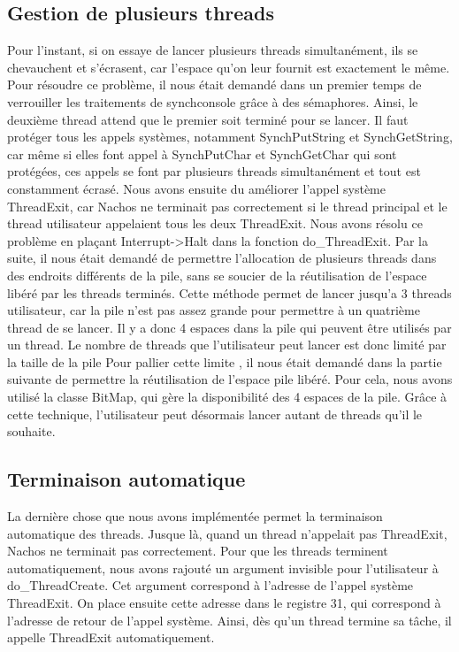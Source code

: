 \documentclass[10pt]{article}
\begin{document}
\subsection{Gestion de plusieurs threads}
Pour l'instant, si on essaye de lancer plusieurs threads simultanément, ils se chevauchent et s'écrasent, car l'espace qu'on leur fournit est exactement le même.
Pour résoudre ce problème, il nous était demandé dans un premier temps de verrouiller les traitements de synchconsole grâce à des sémaphores. Ainsi, le deuxième thread attend que le premier soit terminé pour se lancer. Il faut protéger tous les appels systèmes, notamment \textcolor{blue2}{SynchPutString} et \textcolor{blue2}{SynchGetString}, car même si elles font appel à \textcolor{blue2}{SynchPutChar} et \textcolor{blue2}{SynchGetChar} qui sont protégées, ces appels se font par plusieurs threads simultanément et tout est constamment écrasé.
\newline
Nous avons ensuite du améliorer l'appel système \textcolor{blue2}{ThreadExit}, car Nachos ne terminait pas correctement si le thread principal et le thread utilisateur appelaient tous les deux \textcolor{blue2}{ThreadExit}. Nous avons
résolu ce problème en plaçant \textcolor{red2}{Interrupt->Halt} dans la fonction \textcolor{red2}{do\_ThreadExit}.
\newline
Par la suite, il nous était demandé de permettre l'allocation de plusieurs threads dans des endroits différents de la pile, sans se soucier de la réutilisation de l'espace libéré par les threads terminés.
Cette méthode permet de lancer jusqu'a 3 threads utilisateur, car la pile n'est pas assez grande pour permettre à un quatrième thread de se lancer. Il y a donc 4 espaces dans la pile qui peuvent être utilisés par un thread.
Le nombre de threads que l'utilisateur peut lancer est donc limité
par la taille de la pile
\newline
Pour pallier cette limite , il nous était demandé dans la partie suivante de permettre la réutilisation de l'espace pile libéré.
Pour cela, nous avons utilisé la classe BitMap, qui gère la disponibilité des 4 espaces de la pile.
Grâce à cette technique, l'utilisateur peut désormais lancer autant
de threads qu'il le souhaite.

\subsection{Terminaison automatique}
La dernière chose que nous avons implémentée permet la terminaison automatique des threads. Jusque là, quand un thread n'appelait pas \textcolor{blue2}{ThreadExit}, Nachos ne terminait pas correctement.
Pour que les threads terminent automatiquement, nous avons rajouté un argument invisible pour l'utilisateur à \textcolor{red2}{do\_ThreadCreate}. Cet argument correspond à l'adresse de l'appel système \textcolor{blue2}{ThreadExit}.
On place ensuite cette adresse dans le registre 31, qui correspond à l'adresse de retour de l'appel système. Ainsi, dès qu'un thread termine sa tâche, il appelle \textcolor{blue2}{ThreadExit} automatiquement.
\end{document}
